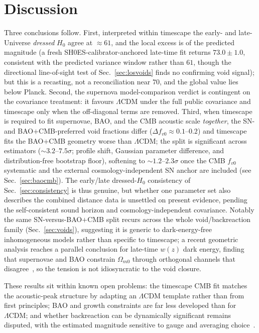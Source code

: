 \documentclass[aps,prd,twocolumn,nofootinbib,superscriptaddress,floatfix]{revtex4-2}
\newcommand{\Ho}{H_{0}}
\newcommand{\fvo}{f_{v0}}
\newcommand{\Lcdm}{\Lambda\mathrm{CDM}}
\begin{document}
\section{Discussion}
\label{sec:discussion}
Three conclusions follow. First, interpreted within timescape the early- and
late-Universe \emph{dressed} $\Ho$ agree at $\approx61$, and the local excess is
of the predicted magnitude (a fresh SH0ES-calibrator-anchored late-time fit
returns $73.0\pm1.0$, consistent with the predicted variance window rather than
$61$, though the directional line-of-sight test of Sec.~\ref{sec:losvoids} finds no
confirming void signal); but
this is a recasting, not a reconciliation near $70$, and the global value lies
below Planck. Second, the supernova
model-comparison verdict is contingent on the covariance treatment: it favours
$\Lcdm$ under the full public covariance and timescape only when the off-diagonal
terms are removed. Third, when timescape is required to fit supernovae, BAO, and
the CMB acoustic scale \emph{together}, the SN- and BAO$+$CMB-preferred void
fractions differ ($\Delta\fvo\approx0.1$--$0.2$) and timescape fits the BAO$+$CMB
geometry worse than $\Lcdm$; the split is significant across estimators
($\sim3.2$--$7.5\sigma$; profile shift, Gaussian parameter difference, and
distribution-free bootstrap floor), softening to $\sim1.2$--$2.3\sigma$ once the CMB
$\fvo$ systematic and the external cosmology-independent SN anchor are included (see
Sec.~\ref{sec:baocmb}). The early/late dressed-$\Ho$ consistency of Sec.~\ref{sec:consistency}
is thus genuine, but whether one parameter set also describes the combined
distance data is unsettled on present evidence, pending the self-consistent sound
horizon and cosmology-independent covariance. Notably the same SN-versus-BAO$+$CMB
split recurs across the whole void/backreaction family (Sec.~\ref{sec:voids}),
suggesting it is generic to dark-energy-free inhomogeneous models rather than
specific to timescape; a recent geometric analysis reaches a parallel conclusion for
late-time $w(z)$ dark energy, finding that supernovae and BAO constrain $\Omega_{m0}$
through orthogonal channels that disagree~\cite{Zhou2026}, so the tension is not
idiosyncratic to the void closure.

These results sit within known open problems: the timescape CMB fit
\cite{Nazer2015} matches the acoustic-peak structure by adapting an $\Lcdm$
template rather than from first principles; BAO and growth constraints are far
less developed than for $\Lcdm$; and whether backreaction can be dynamically
significant remains disputed, with the estimated magnitude sensitive to gauge and
averaging choice~\cite{GreenWald2014,Buchert2015,Verweg2023,Oestreicher2024}.
\end{document}

